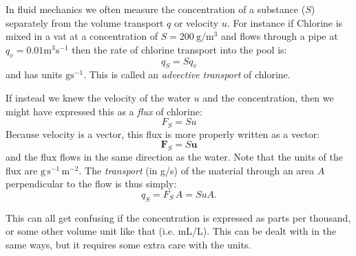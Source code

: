 In fluid mechanics we often measure the concentration of a substance
($S$) separately from the volume transport $q$ or velocity $u$.  For
instance if Chlorine is mixed in a vat at a concentration of $S=200\
\mathrm{g/m^3}$ and flows through a pipe at $q_v=0.01\mathrm{m^3 s^{-1}}$
then the rate of chlorine transport into the pool is:
\begin{equation}
  q_S = S q_v
\end{equation}
and has units $\mathrm{gs^{-1}}$.  This is called an \emph{advective transport}
of chlorine.

If instead we knew the velocity of the water $u$ and the
concentration, then we might have expressed this as a \emph{flux} of
chlorine:
\begin{equation}
  F_S = S u
\end{equation}
Because velocity is a vector, this flux is more properly written as a
vector:
\begin{equation}
  \mathbf{F}_S = S \mathbf{u}
\end{equation}
and the flux flows in the same direction as the water.  Note that the
units of the flux are $\mathrm{g\,s^{-1}\,m^{-2}}$.  The \emph{transport} (in g/s) of
the material through an area $A$ perpendicular to the flow is thus simply:
\begin{equation}
  q_S = F_S\,A = S u A.
\end{equation}

This can all get confusing if the concentration is expressed
as parts per thousand, or some other volume unit like that
(i.e. mL/L).  This can be dealt with in the same ways, but it requires
some extra care with the units.

